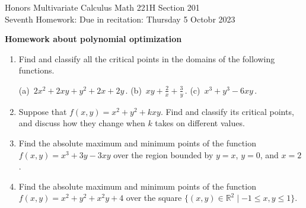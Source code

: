 \documentclass[12pt]{article}
\newcommand{\RR}{{\mathbb R}}  %
\begin{document}
\LARGE 
\noindent
{\color{Maroon}Honors Multivariate Calculus \hfill Math 221H Section 201}\vspace{2pt}\\
\large
Seventh Homework:\hfill 
Due in recitation: Thursday 5 Octobr 2023\vspace{2pt}

\normalsize
    {\bf {\color{Maroon}Homework about polynomial optimization}}\vspace{2pt}

\begin{enumerate}


\item Find and classify all the critical points in the domains of the following functions.

  (a)\ $2x^2 + 2xy + y^2 +2x + 2y\,.$  \qquad
  (b)\  $xy+\frac{2}{x} + \frac{3}{y}\,.$  \qquad
  (c)\ $x^3+y^3-6xy\,.$
\vspace{-2pt}

   
\item Suppose that $f(x,y)=x^2+y^2+kxy$.
  Find and classify its critical points, and discuss how they change when $k$ takes on different values.
\vspace{-2pt}

\item  Find the absolute maximum and minimum points of the function $f(x,y)=x^3+3y-3xy$ over the region bounded by $y=x$, $y=0$, and $x=2$. 
\vspace{-2pt}

   
\item  Find the absolute maximum and minimum points of the function $f(x,y)=x^2+y^2+x^2y+4$ over the square
  $\{(x,y)\in\RR^2\mid -1\leq x,y\leq 1\}$. 
\vspace{-2pt}


\end{enumerate}
\end{document}
